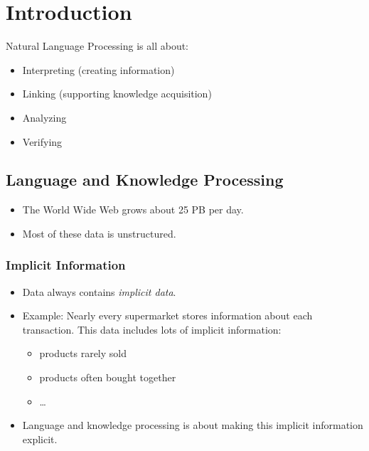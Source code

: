 \chapter{Introduction} %
	Natural Language Processing is all about:
	\begin{itemize}
		\item Interpreting (creating information)
		\item Linking (supporting knowledge acquisition)
		\item Analyzing
		\item Verifying
	\end{itemize}

    \section{Language and Knowledge Processing} %
    	\begin{itemize}
    		\item The World Wide Web grows about 25 PB per day.
    		\item Most of these data is unstructured.
    	\end{itemize}

        \subsection{Implicit Information} %
            \begin{itemize}
            	\item Data always contains \textit{implicit data}.
            	\item Example: Nearly every supermarket stores information about each transaction. This data includes lots of implicit information:
            		\begin{itemize}
            			\item products rarely sold
            			\item products often bought together
            			\item \dots
            		\end{itemize}
            	\item Language and knowledge processing is about making this implicit information explicit.
            \end{itemize}

